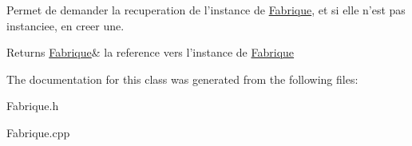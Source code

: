 \-Permet de demander la recuperation de l'instance de \hyperlink{class_l_o21_1_1_fabrique}{\-Fabrique}, et si elle n'est pas instanciee, en creer une. 

\begin{DoxyReturn}{\-Returns}
\hyperlink{class_l_o21_1_1_fabrique}{\-Fabrique}\& la reference vers l'instance de \hyperlink{class_l_o21_1_1_fabrique}{\-Fabrique} 
\end{DoxyReturn}


\-The documentation for this class was generated from the following files\-:\begin{DoxyCompactItemize}
\item 
\-Fabrique.\-h\item 
\-Fabrique.\-cpp\end{DoxyCompactItemize}
